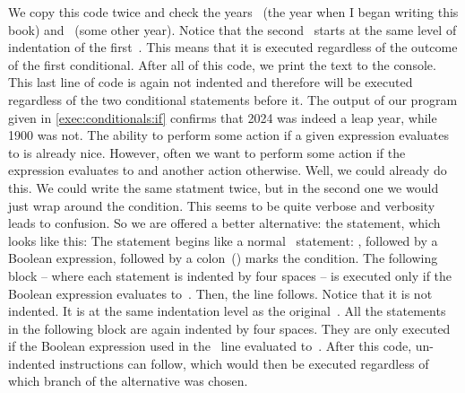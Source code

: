 We copy this code twice and check the years ~(the year when I began writing this book) and ~(some other year).
Notice that the second~ starts at the same level of indentation of the first~.
This means that it is executed regardless of the outcome of the first conditional.
After all of this code, we print the text  to the console.
This last line of code is again not indented and therefore will be executed regardless of the two conditional statements before it.
The output of our program given in \cref{exec:conditionals:if} confirms that 2024 was indeed a leap year, while 1900 was not.%
%
\FloatBarrier%
\endhsection%
%
%
%
%
The ability to perform some action if a given expression evaluates to  is already nice.
However, often we want to perform some action if the expression evaluates to  and another action otherwise.
Well, we could already do this.
We could write the same  statment twice, but in the second one we would just wrap  around the condition.
This seems to be quite verbose and verbosity leads to confusion.
So we are offered a better alternative: the  statement, which looks like this\cite{PSF:P3D:TPT:MCFT}:%
%
%
%
\FloatBarrier%
%
%
%
%
%
%
%
The statement begins like a normal ~statement:
, followed by a Boolean expression, followed by a colon~(\pythonilIdx{:}) marks the condition.
The following block -- where each statement is indented by four spaces -- is executed only if the Boolean expression evaluates to~.
Then, the  line follows.
Notice that it is not indented.
It is at the same indentation level as the original~.
All the statements in the following block are again indented by four spaces.
They are only executed if the Boolean expression used in the ~line evaluated to~.
After this code, un-indented instructions can follow, which would then be executed regardless of which branch of the alternative was chosen.

